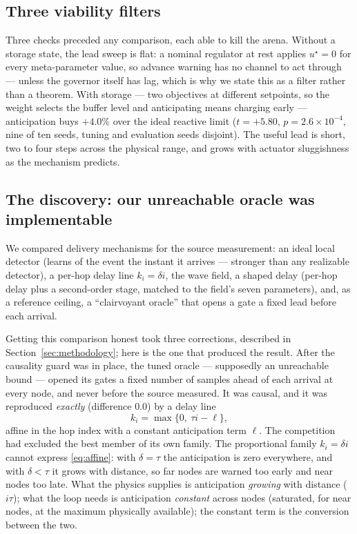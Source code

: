 \documentclass[journal]{IEEEtran}
\theoremstyle{definition}
\begin{document}
\subsection{Three viability filters}
Three checks preceded any comparison, each able to kill the arena. Without a
storage state, the lead sweep is flat: a nominal regulator at rest applies
$u^\star=0$ for every meta-parameter value, so advance warning has no channel
to act through --- unless the governor itself has lag, which is why we state
this as a filter rather than a theorem. With storage --- two objectives at
different setpoints, so the weight selects the buffer level and anticipating
means charging early --- anticipation buys $+4.0\%$ over the ideal reactive
limit ($t=+5.80$, $p=2.6\times10^{-4}$, nine of ten seeds, tuning and
evaluation seeds disjoint). The useful lead is short, two to four steps across
the physical range, and grows with actuator sluggishness as the mechanism
predicts.

\subsection{The discovery: our unreachable oracle was implementable}
We compared delivery mechanisms for the source measurement: an ideal local
detector (learns of the event the instant it arrives --- stronger than any
realizable detector), a per-hop delay line $k_i=\delta i$, the wave field, a
shaped delay (per-hop delay plus a second-order stage, matched to the field's
seven parameters), and, as a reference ceiling, a ``clairvoyant oracle'' that
opens a gate a fixed lead before each arrival.

Getting this comparison honest took three corrections, described in
Section~\ref{sec:methodology}; here is the one that produced the result. After
the causality guard was in place, the tuned oracle --- supposedly an
unreachable bound --- opened its gates a fixed number of samples ahead of
each arrival at every node, and never before the source measured. It was causal, and it was
reproduced \emph{exactly} (difference $0.0$) by a delay line
\begin{equation}
k_i=\max\{0,\ \tau i-\ell\},
\label{eq:affine}
\end{equation}
affine in the hop index with a constant anticipation term $\ell$. The
competition had excluded the best member of its own family. The proportional
family $k_i=\delta i$ cannot express \eqref{eq:affine}: with $\delta=\tau$ the
anticipation is zero everywhere, and with $\delta<\tau$ it grows with distance,
so far nodes are warned too early and near nodes too late. What the physics
supplies is anticipation \emph{growing} with distance ($i\tau$); what the loop
needs is anticipation \emph{constant} across nodes (saturated, for near nodes,
at the maximum physically available); the constant term is the conversion
between the two.
\end{document}

